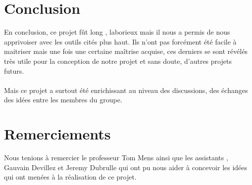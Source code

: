 \documentclass[a4paper,10pt]{article}
\begin{document}
\section{Conclusion}
En conclusion, ce projet fût long , laborieux mais il nous a permis de nous apprivoiser avec les outils cités plus haut. Ils n'ont pas
forcément été facile à maitriser mais une fois une certaine maîtrise acquise, ces derniers se sont révélés très utile pour la conception de 
notre projet et sans doute, d'autres projets futurs. 
\\
\\
Mais ce projet a surtout été enrichissant au niveau des discussions, des échanges des idées entre les membres du groupe.

\section{Remerciements}
Nous tenions à remercier le professeur Tom Mens ainsi que les assistants , Gauvain Devillez et Jeremy Dubrulle qui ont pu nous aider à concevoir les idées qui ont menées 
à la réalisation de ce projet.
\end{document}
